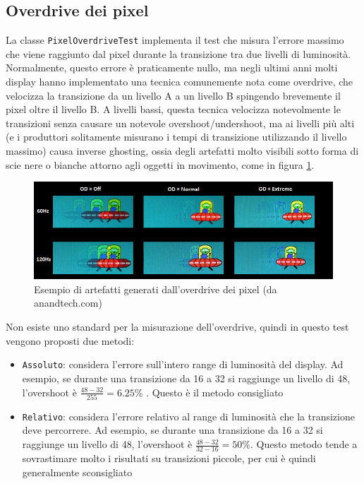\subsection{Overdrive dei pixel}
La classe \texttt{PixelOverdriveTest} implementa il test che misura l'errore massimo che viene raggiunto dal pixel durante la transizione tra due livelli di luminosità. Normalmente, questo errore è praticamente nullo, ma negli ultimi anni molti display hanno implementato una tecnica comunemente nota come overdrive, che velocizza la transizione da un livello A a un livello B spingendo brevemente il pixel oltre il livello B. A livelli bassi, questa tecnica velocizza notevolmente le transizioni senza causare un notevole overshoot/undershoot, ma ai livelli più alti (e i produttori solitamente misurano i tempi di transizione utilizzando il livello massimo) causa inverse ghosting, ossia degli artefatti molto visibili sotto forma di scie nere o bianche attorno agli oggetti in movimento, come in figura \ref{fig:overdrive_ufotest}.
\begin{figure}[H]
	\centering
	\includegraphics[width=\textwidth]{Applicazione_files/overdrive_ufotest.png}
	\caption{Esempio di artefatti generati dall'overdrive dei pixel (da anandtech.com)}
	\label{fig:overdrive_ufotest}
\end{figure}

Non esiste uno standard per la misurazione dell'overdrive, quindi in questo test vengono proposti due metodi:\begin{itemize}
	\item \texttt{Assoluto}: considera l'errore sull'intero range di luminosità del display. Ad esempio, se durante una transizione da 16 a 32 si raggiunge un livello di 48, l'overshoot è $\frac{48-32}{255}=6.25\%$ . Questo è il metodo consigliato
	\item \texttt{Relativo}: considera l'errore relativo al range di luminosità che la transizione deve percorrere. Ad esempio, se durante una transizione da 16 a 32 si raggiunge un livello di 48, l'overshoot è  $\frac{48-32}{32-16}=50\%$. Questo metodo tende a sovrastimare molto i risultati su transizioni piccole, per cui è quindi generalmente sconsigliato
\end{itemize}

